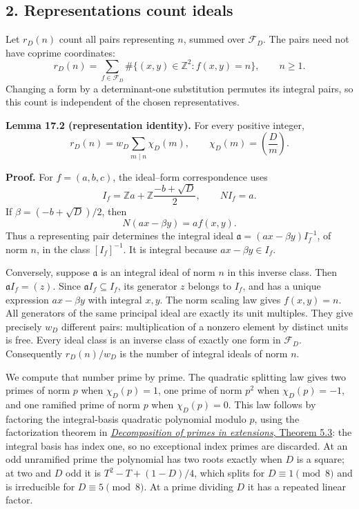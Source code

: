 \documentclass[
  11pt,
  a4paper,
]{article}
\begin{document}
\subsection{2. Representations count
ideals}\label{representations-count-ideals}

Let \(r_D(n)\) count all pairs representing \(n\), summed over
\(\mathcal F_D\). The pairs need not have coprime coordinates: \[
 r_D(n)=\sum_{f\in\mathcal F_D}
        \#\{(x,y)\in\mathbb Z^2:f(x,y)=n\},\qquad n\ge1.
 \tag{17.4}
\] Changing a form by a determinant-one substitution permutes its
integral pairs, so this count is independent of the chosen
representatives.

\textbf{Lemma 17.2 (representation identity).} For every positive
integer, \[
 r_D(n)=w_D\sum_{m\mid n}\chi_D(m),
 \qquad \chi_D(m)=\left(\frac Dm\right).
 \tag{17.5}
\]

\textbf{Proof.} For \(f=(a,b,c)\), the ideal--form correspondence uses
\[
 I_f=\mathbb Za+\mathbb Z\frac{-b+\sqrt D}{2},\qquad NI_f=a.
 \tag{17.6}
\] If \(\beta=(-b+\sqrt D)/2\), then \[
 N(ax-\beta y)=a f(x,y).
 \tag{17.7}
\] Thus a representing pair determines the integral ideal
\(\mathfrak a=(ax-\beta y)I_f^{-1}\), of norm \(n\), in the class
\([I_f]^{-1}\). It is integral because \(ax-\beta y\in I_f\).

Conversely, suppose \(\mathfrak a\) is an integral ideal of norm \(n\)
in this inverse class. Then \(\mathfrak a I_f=(z)\). Since
\(\mathfrak a I_f\subseteq I_f\), its generator \(z\) belongs to
\(I_f\), and has a unique expression \(ax-\beta y\) with integral
\(x,y\). The norm scaling law gives \(f(x,y)=n\). All generators of the
same principal ideal are exactly its unit multiples. They give precisely
\(w_D\) different pairs: multiplication of a nonzero element by distinct
units is free. Every ideal class is an inverse class of exactly one form
in \(\mathcal F_D\). Consequently \(r_D(n)/w_D\) is the number of
integral ideals of norm \(n\).

We compute that number prime by prime. The quadratic splitting law gives
two primes of norm \(p\) when \(\chi_D(p)=1\), one prime of norm \(p^2\)
when \(\chi_D(p)=-1\), and one ramified prime of norm \(p\) when
\(\chi_D(p)=0\). This law follows by factoring the integral-basis
quadratic polynomial modulo \(p\), using the factorization theorem in
\href{https://kokunoyumeto.github.io/open-math-courses-public/courses/NT-ANT/decomposition-of-primes-in-extensions.html\#reading-primes-from-a-polynomial}{\emph{Decomposition
of primes in extensions}, Theorem 5.3}: the integral basis has index
one, so no exceptional index primes are discarded. At an odd unramified
prime the polynomial has two roots exactly when \(D\) is a square; at
two and \(D\) odd it is \(T^2-T+(1-D)/4\), which splits for
\(D\equiv1\pmod8\) and is irreducible for \(D\equiv5\pmod8\). At a prime
dividing \(D\) it has a repeated linear factor.
\end{document}
